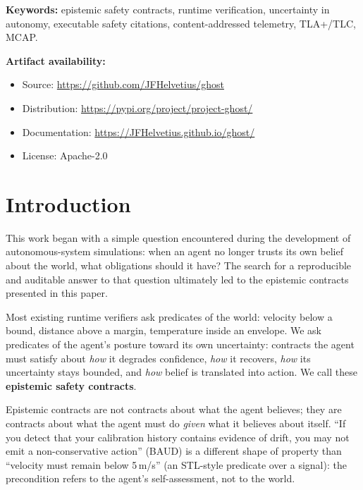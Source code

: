 \documentclass[acmsmall,nonacm=true,review=false]{acmart}
\theoremstyle{plain}
\begin{document}
\maketitle

\medskip
\noindent\textbf{Keywords:} epistemic safety contracts, runtime
verification, uncertainty in autonomy, executable safety citations,
content-addressed telemetry, TLA+/TLC, MCAP.

\medskip
\noindent\textbf{Artifact availability:}
\begin{itemize}[noitemsep,topsep=0pt]
  \item Source: \url{https://github.com/JFHelvetius/ghost}
  \item Distribution: \url{https://pypi.org/project/project-ghost/}
  \item Documentation: \url{https://JFHelvetius.github.io/ghost/}
  \item License: Apache-2.0
\end{itemize}

\section{Introduction}
\label{sec:intro}

This work began with a simple question encountered during the
development of autonomous-system simulations: when an agent no
longer trusts its own belief about the world, what obligations
should it have? The search for a reproducible and auditable
answer to that question ultimately led to the epistemic contracts
presented in this paper.

Most existing runtime verifiers ask predicates of the world:
velocity below a bound, distance above a margin, temperature
inside an envelope. We ask predicates of the agent's posture
toward its own uncertainty: contracts the agent must satisfy
about \emph{how} it degrades confidence, \emph{how} it recovers,
\emph{how} its uncertainty stays bounded, and \emph{how} belief
is translated into action. We call these \textbf{epistemic safety
contracts}.

Epistemic contracts are not contracts about what the agent
believes; they are contracts about what the agent must do
\emph{given} what it believes about itself.
``If you detect that your calibration history contains evidence of
drift, you may not emit a non-conservative action'' (BAUD) is a
different shape of property than ``velocity must remain below
5\,m/s'' (an STL-style predicate over a signal): the precondition
refers to the agent's self-assessment, not to the world.
\end{document}
